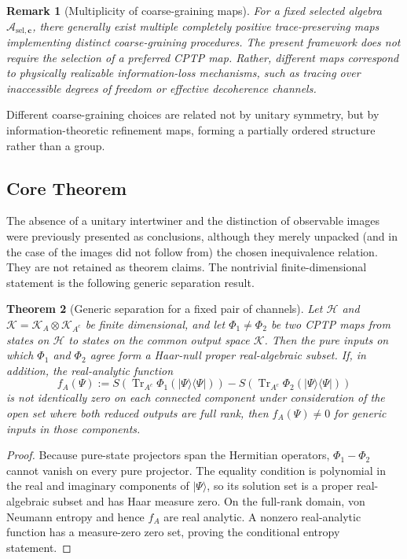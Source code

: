 \documentclass[12pt,a4paper,openany]{book}
\newtheorem{theorem}{Theorem}[chapter]
\newtheorem{remark}[theorem]{Remark}
\begin{document}
\begin{remark}[Multiplicity of coarse-graining maps]
For a fixed selected algebra $\mathcal{A}_{\mathrm{sel},\mathbf{c}}$, there generally exist multiple completely positive trace-preserving maps implementing distinct coarse-graining procedures.
The present framework does not require the selection of a preferred CPTP map. 
Rather, different maps correspond to physically realizable information-loss mechanisms, such as tracing over inaccessible degrees of freedom or effective decoherence channels.
\end{remark}

Different coarse-graining choices are related not by unitary symmetry, but by information-theoretic refinement maps, forming a partially ordered structure rather than a group.

\subsection{Core Theorem}

The absence of a unitary intertwiner and the distinction of observable images were previously presented as conclusions, although they merely unpacked (and in the case of the images did not follow from) the chosen inequivalence relation.  They are not retained as theorem claims.  The nontrivial finite-dimensional statement is the following generic separation result.

\begin{theorem}[Generic separation for a fixed pair of channels]
\label{A-thm:inequiv}
Let $\mathcal H$ and $\mathcal K=\mathcal K_A\otimes\mathcal K_{A^c}$ be finite dimensional, and let $\Phi_1\ne\Phi_2$ be two CPTP maps from states on $\mathcal H$ to states on the common output space $\mathcal K$.  Then the pure inputs on which $\Phi_1$ and $\Phi_2$ agree form a Haar-null proper real-algebraic subset.  If, in addition, the real-analytic function
\[
f_A(\Psi):=
S\!\left(\operatorname{Tr}_{A^c}\Phi_1(|\Psi\rangle\!\langle\Psi|)\right)
-S\!\left(\operatorname{Tr}_{A^c}\Phi_2(|\Psi\rangle\!\langle\Psi|)\right)
\]
is not identically zero on each connected component under consideration of the open set where both reduced outputs are full rank, then $f_A(\Psi)\ne0$ for generic inputs in those components.
\end{theorem}

\begin{proof}
Because pure-state projectors span the Hermitian operators, $\Phi_1-\Phi_2$ cannot vanish on every pure projector.  The equality condition is polynomial in the real and imaginary components of $|\Psi\rangle$, so its solution set is a proper real-algebraic subset and has Haar measure zero.  On the full-rank domain, von Neumann entropy and hence $f_A$ are real analytic.  A nonzero real-analytic function has a measure-zero zero set, proving the conditional entropy statement.
\end{proof}
\end{document}
